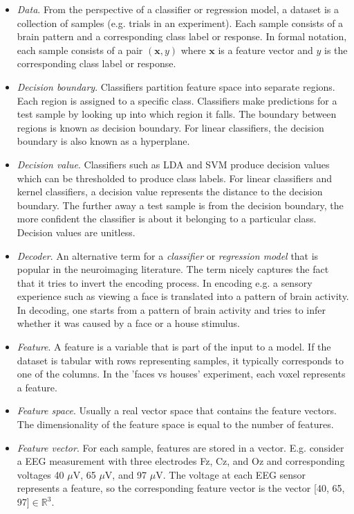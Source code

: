 \documentclass[utf8]{frontiersSCNS} %
\newcommand{\x}{\mathbf{x}}
\newcommand{\R}{\mathbb{R}}
\begin{document}
\begin{itemize}
\item \textit{Data}. From the perspective of a classifier or regression model, a dataset is a collection of samples (e.g. trials in an experiment). Each sample consists of a brain pattern and a corresponding class label or response. In formal notation, each sample consists of a pair $(\x, y)$ where $\x$ is a feature vector and $y$ is the corresponding class label or response.
\item \textit{Decision boundary}. Classifiers partition feature space into separate regions. Each region is assigned to a specific class. Classifiers make predictions for a test sample by looking up into which region it falls. The boundary between regions is known as decision boundary. For linear classifiers, the decision boundary is also known as a hyperplane.
\item \textit{Decision value}. Classifiers such as LDA and SVM produce decision values which can be thresholded to produce class labels. For linear classifiers and kernel classifiers, a decision value represents the distance to the decision boundary. The further away a test sample is from the decision boundary, the more confident the classifier is about it belonging to a particular class. Decision values are unitless.
\item \textit{Decoder}. An alternative term for a \textit{classifier} or \textit{regression model} that is popular in the neuroimaging literature. The term nicely captures the fact that it tries to invert the encoding process. In encoding e.g. a sensory experience such as viewing a face is translated into a pattern of brain activity. In decoding, one starts from a pattern of brain activity and tries to infer whether it was caused by a face or a house stimulus.
\item \textit{Feature}. A feature is a variable that is part of the input to a model. If the dataset is tabular with rows representing samples, it typically corresponds to one of the columns. In the 'faces vs houses' experiment, each voxel represents a feature.
\item \textit{Feature space}. Usually a real vector space that contains the feature vectors. The dimensionality of the feature space is equal to the number of features.
\item \textit{Feature vector}. For each sample, features are stored in a vector. E.g. consider a EEG measurement with three electrodes Fz, Cz, and Oz and corresponding voltages 40 $\mu$V, 65 $\mu$V, and 97 $\mu$V. The voltage at each EEG sensor represents a feature, so the corresponding feature vector is the vector [40, 65, 97]$\in\R^3$.

\end{itemize}
\end{document}
